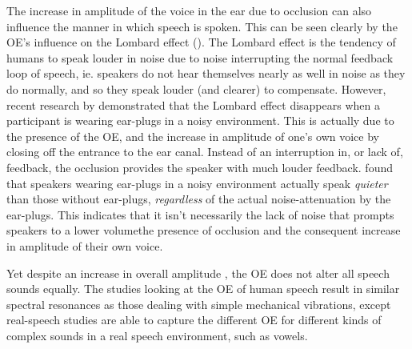 The increase in amplitude of the voice in the ear due to occlusion can also influence the manner in which speech is spoken.  This can be seen clearly by the OE's influence on the Lombard effect (\cite{lombard:11,lane:71}).  The Lombard effect is the tendency of humans to speak louder in noise due to noise interrupting the normal feedback loop of speech, ie. speakers do not hear themselves nearly as well in noise as they do normally, and so they speak louder (and clearer) to compensate.  However, recent research by \cite{brungart:12} demonstrated that the Lombard effect disappears when a participant is wearing ear-plugs in a noisy environment.  This is actually due to the presence of the OE, and the increase in amplitude of one's own voice by closing off the entrance to the ear canal.  Instead of an interruption in, or lack of, feedback, the occlusion provides the speaker with much louder feedback.  \cite{brungart:12} found that speakers wearing ear-plugs in a noisy environment actually speak \textit{quieter} than those without ear-plugs, \textit{regardless} of the actual noise-attenuation by the ear-plugs.  This indicates that it isn't necessarily the lack of noise that prompts speakers to \DIFdelbegin {}\DIFdelend \DIFaddbegin {}\DIFaddend a lower volume\DIFdelbegin {}\DIFdelend \DIFaddbegin {}\DIFaddend the presence of occlusion and the consequent increase in amplitude of their own voice.

Yet despite an increase in overall amplitude \DIFaddbegin {}\DIFaddend , the OE does not alter all speech sounds equally.  The studies looking at the OE of human speech result in similar spectral resonances as those dealing with simple mechanical vibrations, except real-speech studies are able to capture the different OE for different kinds of complex sounds in a real speech environment, such as vowels.  



